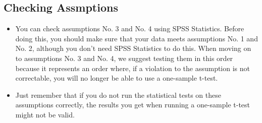 \documentclass[]{article}
\begin{document}
\subsection{Checking Assmptions}
\begin{itemize}
	\item You can check assumptions No. 3 and No. 4 using SPSS Statistics. Before doing this, you should make sure that your data meets assumptions No. 1 and No. 2, although you don't need SPSS Statistics to do this. When moving on to assumptions No. 3 and No. 4, we suggest testing them in this order because it represents an order where, if a violation to the assumption is not correctable, you will no longer be able to use a one-sample t-test. 
	\item Just remember that if you do not run the statistical tests on these assumptions correctly, the results you get when running a one-sample t-test might not be valid. 
\end{itemize}
\end{document}
